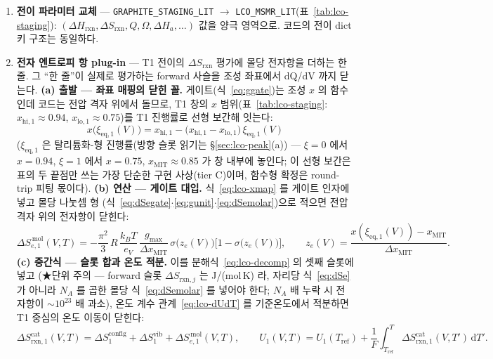 \documentclass[11pt,a4paper]{article}
\newcommand{\dd}{\mathrm{d}}
\newcommand{\eq}{\mathrm{eq}}
\newcommand{\rxn}{\mathrm{rxn}}
\newcommand{\code}[1]{\texttt{#1}}
\begin{document}
\begin{enumerate}[label=(\roman*),leftmargin=2.2em,itemsep=1pt]
\item \textbf{전이 파라미터 교체} — \code{GRAPHITE\_STAGING\_LIT} $\to$ \code{LCO\_MSMR\_LIT}(표~\ref{tab:lco-staging}):
$(\Delta H_\rxn,\Delta S_\rxn,Q,\Omega,\Delta H_a,\dots)$ 값을 양극 영역으로. 코드의 전이 dict 키 구조는 동일하다.
\item \textbf{전자 엔트로피 항 plug-in} — T1 전이의 $\Delta S_{\rxn}$ 평가에 몰당 전자항을 더하는 한 줄.
그 ``한 줄''이 실제로 평가하는 forward 사슬을 조성 좌표에서 dQ/dV 까지 닫는다.
\textbf{(a) 출발 — 좌표 매핑의 닫힌 꼴.} 게이트(식~\eqref{eq:ggate})는 조성 $x$ 의 함수인데 코드는 전압
격자 위에서 돌므로, T1 창의 $x$ 범위(표~\ref{tab:lco-staging}: $x_{\mathrm{hi},1}{\approx}0.94$,
$x_{\mathrm{lo},1}{\approx}0.75$)를 T1 진행률로 선형 보간해 잇는다:
\begin{equation}
x\big(\xi_{\eq,1}(V)\big)=x_{\mathrm{hi},1}-\big(x_{\mathrm{hi},1}-x_{\mathrm{lo},1}\big)\,\xi_{\eq,1}(V)
\label{eq:lco-xmap}
\end{equation}
($\xi_{\eq,1}$ 은 탈리튬화-형 진행률(방향 슬롯 읽기는 \S\ref{sec:lco-peak}(a)) — $\xi{=}0$ 에서
$x{=}0.94$, $\xi{=}1$ 에서 $x{=}0.75$, $x_\mathrm{MIT}{\approx}0.85$ 가 창 내부에 놓인다; 이 선형 보간은
표의 두 끝점만 쓰는 가장 단순한 구현 사상(tier C)이며, 함수형 확정은 round-trip 피팅 몫이다).
\textbf{(b) 연산 — 게이트 대입.} 식~\eqref{eq:lco-xmap} 를 게이트 인자에 넣고 몰당 나눗셈 형
(식~\eqref{eq:dSegate}$\cdot$\eqref{eq:gunit}$\cdot$\eqref{eq:dSemolar})으로 적으면 전압 격자 위의
전자항이 닫힌다:
\begin{equation}
\Delta S_{e,1}^{\,\mathrm{mol}}(V,T)
=-\frac{\pi^2}{3}\,R\,\frac{k_BT}{e_V}\,\frac{g_{\max}}{\Delta x_\mathrm{MIT}}\,
\sigma\!\big(z_e(V)\big)\big[1-\sigma\!\big(z_e(V)\big)\big],
\qquad z_e(V)=\frac{x(\xi_{\eq,1}(V))-x_\mathrm{MIT}}{\Delta x_\mathrm{MIT}}.
\label{eq:lco-SeV}
\end{equation}
\textbf{(c) 중간식 — 슬롯 합과 온도 적분.} 이를 분해식~\eqref{eq:lco-decomp} 의 셋째 슬롯에 넣고
(★단위 주의 — forward 슬롯 $\Delta S_{\rxn,j}$ 는 J/(mol\,K) 라, 자리당 식~\eqref{eq:dSe} 가 아니라
$N_A$ 를 곱한 몰당 식~\eqref{eq:dSemolar} 를 넣어야 한다; $N_A$ 배 누락 시 전자항이 $\sim10^{23}$ 배
과소), 온도 계수 관계~\eqref{eq:lco-dUdT} 를 기준온도에서 적분하면 T1 중심의 온도 이동이 닫힌다:
\begin{equation}
\Delta S_{\rxn,1}^\mathrm{cat}(V,T)=\Delta S_1^\mathrm{config}+\Delta S_1^\mathrm{vib}
+\Delta S_{e,1}^{\,\mathrm{mol}}(V,T),\qquad
U_1(V,T)=U_1(T_\mathrm{ref})+\frac1F\int_{T_\mathrm{ref}}^{T}\Delta S_{\rxn,1}^\mathrm{cat}(V,T')\,\dd T'.

\end{equation}
\end{enumerate}
\end{document}
